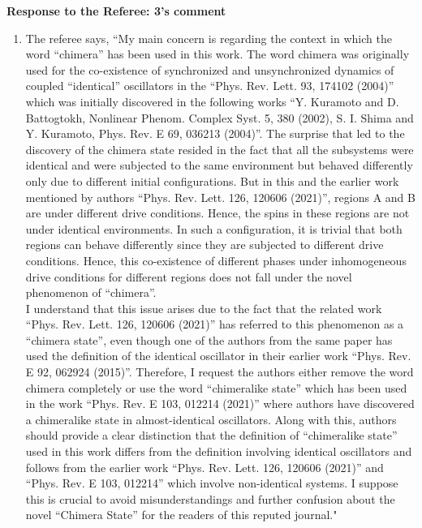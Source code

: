 \documentclass[10pt,
superscriptaddress,
amsmath,amssymb,showkeys,
aps, 
prb,
]{revtex4-2}
\newcommand{\comment}[1]{{\color{blue}#1}} %
\begin{document}
\begin{enumerate}
	\newpage
	\noindent \textbf{Response to the Referee: 3's comment}
	\begin{enumerate}
		\item The referee says, \comment{``My main concern is regarding the context in which the word “chimera” has been used
			in this work. The word chimera was originally used for the co-existence of synchronized and unsynchronized dynamics of coupled “identical” oscillators in the “Phys. Rev. Lett. 93, 174102 (2004)” which was initially discovered in the following
			works “Y. Kuramoto and D. Battogtokh, Nonlinear Phenom. Complex Syst. 5, 380 (2002), S. I. Shima and Y. Kuramoto, Phys. Rev. E 69, 036213 (2004)”. The surprise that led to the discovery of the chimera state resided in the fact that all the
			subsystems were identical and were subjected to the same environment but behaved differently only due to different initial configurations. But in this and the earlier work mentioned by authors “Phys. Rev. Lett. 126, 120606 (2021)”, regions A and B are under different drive conditions. Hence, the spins in these regions are not under identical environments. In such a configuration, it is trivial that both regions can behave differently since they are subjected to different drive conditions. Hence, this co-existence of different phases under inhomogeneous drive conditions for different
			regions does not fall under the novel phenomenon of “chimera”.\\
			
			I understand that this issue arises due to the fact that the related work “Phys. Rev. Lett. 126, 120606 (2021)” has referred to this phenomenon as a “chimera state”, even though one of the authors from the same paper has used the definition of the identical oscillator in their earlier work “Phys. Rev. E 92, 062924 (2015)”. Therefore, I request the authors either remove the word chimera completely or use the word “chimeralike state” which has been used in the work “Phys. Rev. E 103, 012214 (2021)” where authors have discovered a chimeralike state in almost-identical oscillators. Along with this, authors should provide a clear distinction that the definition of “chimeralike state” used in this work differs from the definition involving identical oscillators and follows from the earlier work “Phys. Rev. Lett. 126, 120606 (2021)” and “Phys. Rev. E 103, 012214” which involve non-identical systems. I
			suppose this is crucial to avoid misunderstandings and further confusion about the novel “Chimera State” for the readers of this reputed journal."}\\
		

\end{enumerate}
\end{enumerate}
\end{document}
